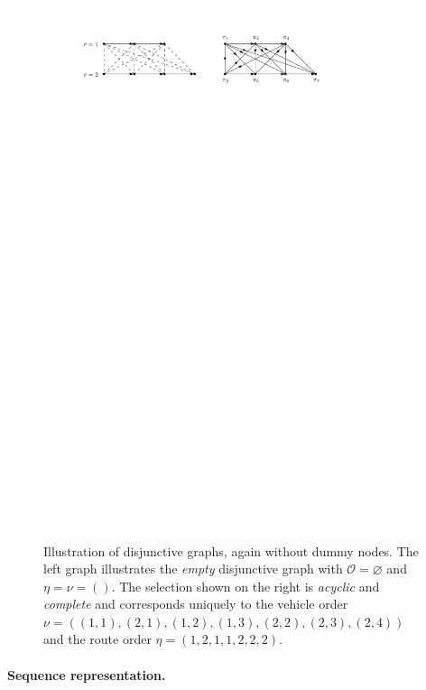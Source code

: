 \documentclass[a4paper]{report}
\theoremstyle{definition}
\theoremstyle{plain}
\begin{document}
\begin{figure}
  \centering
  \includegraphics[width=0.98\textwidth]{figures/single/disjunctive_graph.pdf}
  \caption{Illustration of disjunctive graphs, again without dummy nodes. The
    left graph illustrates the \textit{empty} disjunctive graph with $\mathcal{O} = \varnothing$
    and $\eta = \nu = ()$. The selection shown on the right is \emph{acyclic} and \emph{complete}
    and corresponds uniquely to the vehicle order
    $\nu = ((1,1), (2,1), (1,2), (1,3), (2,2), (2,3), (2,4))$ and the route order
    $\eta = (1, 2, 1, 1, 2, 2, 2)$.}\label{fig:disjunctive-graphs}
\end{figure}

\paragraph{Sequence representation.}
\end{document}
